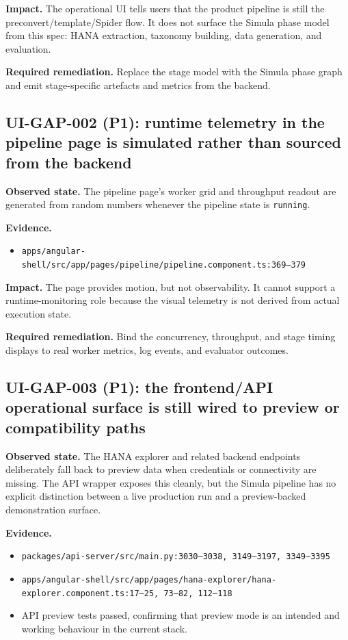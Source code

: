 \textbf{Impact.}
The operational UI tells users that the product pipeline is still the
preconvert/template/Spider flow. It does not surface the Simula phase
model from this spec: HANA extraction, taxonomy building, data
generation, and evaluation.

\textbf{Required remediation.}
Replace the stage model with the Simula phase graph and emit
stage-specific artefacts and metrics from the backend.

\subsection*{UI-GAP-002 (P1): runtime telemetry in the pipeline page is simulated rather than sourced from the backend}
\textbf{Observed state.}
The pipeline page's worker grid and throughput readout are generated
from random numbers whenever the pipeline state is \texttt{running}.

\textbf{Evidence.}
\begin{itemize}
  \item \texttt{apps/angular-shell/src/app/pages/pipeline/pipeline.component.ts:369--379}
\end{itemize}

\textbf{Impact.}
The page provides motion, but not observability. It cannot support a
runtime-monitoring role because the visual telemetry is not derived
from actual execution state.

\textbf{Required remediation.}
Bind the concurrency, throughput, and stage timing displays to real
worker metrics, log events, and evaluator outcomes.

\subsection*{UI-GAP-003 (P1): the frontend/API operational surface is still wired to preview or compatibility paths}
\textbf{Observed state.}
The HANA explorer and related backend endpoints deliberately fall back
to preview data when credentials or connectivity are missing. The API
wrapper exposes this cleanly, but the Simula pipeline has no explicit
distinction between a live production run and a preview-backed
demonstration surface.

\textbf{Evidence.}
\begin{itemize}
  \item \texttt{packages/api-server/src/main.py:3030--3038,
    3149--3197, 3349--3395}
  \item \texttt{apps/angular-shell/src/app/pages/hana-explorer/hana-explorer.component.ts:17--25, 73--82, 112--118}
  \item API preview tests passed, confirming that preview mode is an
    intended and working behaviour in the current stack.
\end{itemize}

